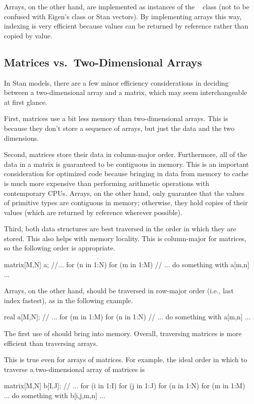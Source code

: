 Arrays, on the other hand, are implemented as instances of the \Cpp \ 
 class (not to be confused with Eigen's
 class or Stan vectors).  By implementing arrays
this way, indexing is very efficient because values can be returned by
reference rather than copied by value.

\subsection{Matrices vs.\ Two-Dimensional Arrays}

In Stan models, there are a few minor efficiency considerations in
deciding between a two-dimensional array and a matrix, which may seem
interchangeable at first glance.  

First, matrices use a bit less memory than two-dimensional arrays.
This is because they don't store a sequence of arrays, but just the
data and the two dimensions.  

Second, matrices store their data in column-major order.  Furthermore,
all of the data in a matrix is guaranteed to be contiguous in memory.
This is an important consideration for optimized code because bringing
in data from memory to cache is much more expensive than performing
arithmetic operations with contemporary CPUs.  Arrays, on the other
hand, only guarantee that the values of primitive types are contiguous
in memory; otherwise, they hold copies of their values (which are
returned by reference wherever possible).

Third, both data structures are best traversed in the order in which
they are stored.  This also helps with memory locality.  This is
column-major for matrices, so the following order is appropriate.
%
\begin{stancode}
matrix[M,N] a;
//...
for (n in 1:N)
  for (m in 1:M)
    // ... do something with a[m,n] ...
\end{stancode}
%
Arrays, on the other hand, should be traversed in row-major order
(i.e., last index fastest), as in the following example.
%
\begin{stancode}
real a[M,N];
// ...
for (m in 1:M)
  for (n in 1:N)
    // ... do something with a[m,n] ...
\end{stancode}
%
The first use of  should bring  into memory.
Overall, traversing matrices is more efficient than traversing arrays.

This is true even for arrays of matrices.  For example, the ideal
order in which to traverse a two-dimensional array of matrices is
%
\begin{stancode}
matrix[M,N] b[I,J];
// ...
for (i in 1:I)
  for (j in 1:J)
    for (n in 1:N)
      for (m in 1:M)
        ... do something with b[i,j,m,n] ...
\end{stancode}

